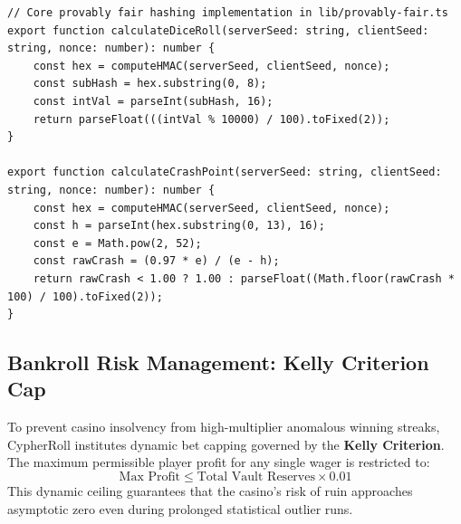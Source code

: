 \begin{lstlisting}[language=Solidity,caption={TypeScript Implementation of Provably Fair Calculation}]
// Core provably fair hashing implementation in lib/provably-fair.ts
export function calculateDiceRoll(serverSeed: string, clientSeed: string, nonce: number): number {
    const hex = computeHMAC(serverSeed, clientSeed, nonce);
    const subHash = hex.substring(0, 8);
    const intVal = parseInt(subHash, 16);
    return parseFloat(((intVal % 10000) / 100).toFixed(2));
}

export function calculateCrashPoint(serverSeed: string, clientSeed: string, nonce: number): number {
    const hex = computeHMAC(serverSeed, clientSeed, nonce);
    const h = parseInt(hex.substring(0, 13), 16);
    const e = Math.pow(2, 52);
    const rawCrash = (0.97 * e) / (e - h);
    return rawCrash < 1.00 ? 1.00 : parseFloat((Math.floor(rawCrash * 100) / 100).toFixed(2));
}
\end{lstlisting}

\subsection{Bankroll Risk Management: Kelly Criterion Cap}
To prevent casino insolvency from high-multiplier anomalous winning streaks, CypherRoll institutes dynamic bet capping governed by the \textbf{Kelly Criterion}. The maximum permissible player profit for any single wager is restricted to:
$$\text{Max Profit} \le \text{Total Vault Reserves} \times 0.01$$
This dynamic ceiling guarantees that the casino's risk of ruin approaches asymptotic zero even during prolonged statistical outlier runs.
